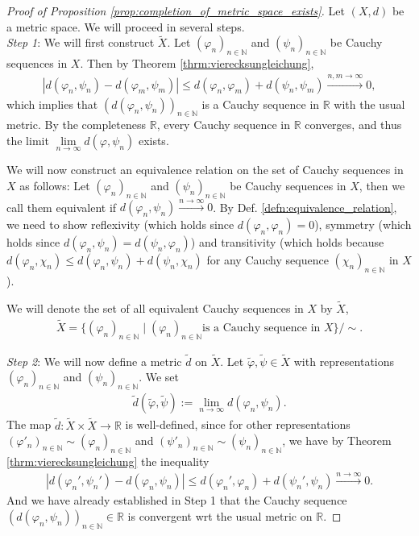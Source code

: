 \documentclass[12pt, a4paper]{article}
\numberwithin{equation}{section}
\theoremstyle{definition}
\theoremstyle{definition}
\newcommand{\abs}[1]{\left\vert #1 \right\vert}
\newcommand{\seq}[1][\varphi]{\left( #1 \right)_{n \in \mathbb{N}}}
\begin{document}
	\begin{proof}[Proof of Proposition \ref{prop:completion_of_metric_space_exists}]
		Let $(X, d)$ be a metric space. We will proceed in several steps. 
		\\
		
		\textit{Step 1}: We will first construct $\tilde{X}$. Let $\seq[\varphi_n]$ and $\seq[\psi_n]$ be Cauchy sequences in $X$. Then by Theorem \ref{thrm:vierecksungleichung}, 
		\begin{align}
			\abs{d(\varphi_n, \psi_n) - d(\varphi_m, \psi_m)} \leq d(\varphi_n, \varphi_m) + d(\psi_n, \psi_m) \overset{n, m\to\infty}{\longrightarrow} 0,
		\end{align}
		which implies that $\seq[d(\varphi_n, \psi_n)]$ is a Cauchy sequence in $\mathbb R$ with the usual metric. By the completeness $\mathbb R$, every Cauchy sequence in $\mathbb R$ converges, and thus the limit $\lim\limits_{n\to\infty}d(\varphi, \psi_n)$ exists.
		
		We will now construct an equivalence relation on the set of Cauchy sequences in $X$ as follows: Let $\seq[\varphi_n]$ and $\seq[\psi_n]$ be Cauchy sequences in $X$, then we call them equivalent if $d(\varphi_n, \psi_n) \overset{n\to\infty}{\longrightarrow} 0$. By Def. \ref{defn:equivalence_relation}, we need to show reflexivity (which holds since $d(\varphi_n, \varphi_n) = 0$), symmetry (which holds since $d(\varphi_n, \psi_n) = d(\psi_n, \varphi_n)$) and transitivity (which holds because $d(\varphi_n, \chi_n) \leq d(\varphi_n, \psi_n) + d(\psi_n, \chi_n)$ for any Cauchy sequence $\seq[\chi_n]$ in $X$). 
		
		We will denote the set of all equivalent Cauchy sequences in $X$ by $\tilde{X}$,
		\begin{align}
			\tilde{X} = \{ \seq[\varphi_n] \mid \seq[\varphi_n] \text{is a Cauchy sequence in } X \} / \sim.
		\end{align}
		
		\textit{Step 2}: We will now define a metric $\tilde{d}$ on $\tilde{X}$. Let $\tilde{\varphi}, \tilde{\psi}\in\tilde{X}$ with representations $\seq[\varphi_n]$ and $\seq[\psi_n]$. We set 
		\begin{align}
			\tilde{d}\left(\tilde{\varphi}, \tilde{\psi}\right) := \lim\limits_{n\to\infty}d(\varphi_n, \psi_n).
		\end{align}
		The map $\tilde{d}: \tilde{X}\times\tilde{X}\to\mathbb R$ is well-defined, since for other representations $\seq[\varphi'_n] \sim \seq[\varphi_n]$ and $\seq[\psi'_n]\sim\seq[\psi_n]$, we have by Theorem \ref{thrm:vierecksungleichung} the inequality
		\begin{align}
			\abs{d(\varphi_n', \psi_n') - d(\varphi_n, \psi_n)} \leq d(\varphi_n', \varphi_n) + d(\psi_n', \psi_n) \overset{n\to\infty}{\longrightarrow} 0.
		\end{align}
		And we have already established in Step 1 that the Cauchy sequence $\seq[d(\varphi_n, \psi_n)]\in\mathbb R$ is convergent wrt the usual metric on $\mathbb R$.
		

\end{proof}
\end{document}
